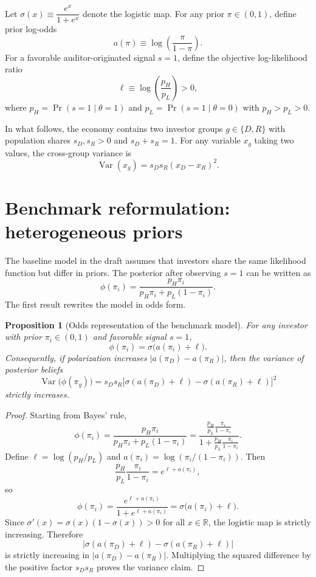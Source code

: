 \documentclass[12pt]{article}
\newtheorem{proposition}{Proposition}
\begin{document}
Let $\sigma(x) \equiv \dfrac{e^x}{1+e^x}$ denote the logistic map. For any prior $\pi \in (0,1)$, define prior log-odds
\[
    a(\pi) \equiv \log\!\left(\frac{\pi}{1-\pi}\right).
\]
For a favorable auditor-originated signal $s=1$, define the objective log-likelihood ratio
\[
    \ell \equiv \log\!\left(\frac{p_H}{p_L}\right) > 0,
\]
where $p_H = \Pr(s=1\mid \theta=1)$ and $p_L = \Pr(s=1\mid \theta=0)$ with $p_H>p_L>0$.

In what follows, the economy contains two investor groups $g\in\{D,R\}$ with population shares $s_D,s_R>0$ and $s_D+s_R=1$. For any variable $x_g$ taking two values, the cross-group variance is
\[
    \operatorname{Var}(x_g)=s_Ds_R(x_D-x_R)^2.
\]

\section{Benchmark reformulation: heterogeneous priors}

The baseline model in the draft assumes that investors share the same likelihood function but differ in priors. The posterior after observing $s=1$ can be written as
\[
    \phi(\pi_i)=\frac{p_H\pi_i}{p_H\pi_i+p_L(1-\pi_i)}.
\]
The first result rewrites the model in odds form.

\begin{proposition}[Odds representation of the benchmark model]\label{prop:odds}
For any investor with prior $\pi_i\in(0,1)$ and favorable signal $s=1$,
\[
    \phi(\pi_i)=\sigma\!\big(a(\pi_i)+\ell\big).
\]
Consequently, if polarization increases $|a(\pi_D)-a(\pi_R)|$, then the variance of posterior beliefs
\[
    \operatorname{Var}\big(\phi(\pi_g)\big)=s_Ds_R\big[\sigma(a(\pi_D)+\ell)-\sigma(a(\pi_R)+\ell)\big]^2
\]
strictly increases.
\end{proposition}

\begin{proof}
Starting from Bayes' rule,
\[
    \phi(\pi_i)=\frac{p_H\pi_i}{p_H\pi_i+p_L(1-\pi_i)}
    =\frac{\frac{p_H}{p_L}\frac{\pi_i}{1-\pi_i}}{1+\frac{p_H}{p_L}\frac{\pi_i}{1-\pi_i}}.
\]
Define $\ell=\log(p_H/p_L)$ and $a(\pi_i)=\log(\pi_i/(1-\pi_i))$. Then
\[
    \frac{p_H}{p_L}\frac{\pi_i}{1-\pi_i}=e^{\ell+a(\pi_i)},
\]
so
\[
    \phi(\pi_i)=\frac{e^{\ell+a(\pi_i)}}{1+e^{\ell+a(\pi_i)}}=\sigma\!\big(a(\pi_i)+\ell\big).
\]
Since $\sigma'(x)=\sigma(x)(1-\sigma(x))>0$ for all $x\in\mathbb{R}$, the logistic map is strictly increasing. Therefore
\[
    \big|\sigma(a(\pi_D)+\ell)-\sigma(a(\pi_R)+\ell)\big|
\]
is strictly increasing in $|a(\pi_D)-a(\pi_R)|$. Multiplying the squared difference by the positive factor $s_Ds_R$ proves the variance claim.
\end{proof}
\end{document}
